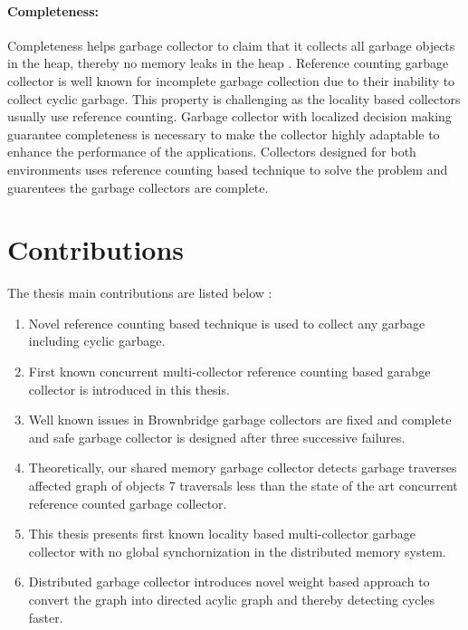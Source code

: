 \paragraph{Completeness:}
	Completeness helps garbage collector to claim that it collects all garbage objects in the heap, thereby no memory leaks in the heap . Reference counting garbage collector is well known for incomplete garbage collection due to their inability to collect cyclic garbage. This property is challenging as the locality based collectors usually use reference counting. Garbage collector with localized decision making guarantee completeness is necessary to make the collector highly adaptable to enhance the performance of the applications. Collectors designed for both environments uses reference counting based technique to solve the problem and guarentees the garbage collectors are complete.
\section{Contributions}
\label{intro:contr}
The thesis main contributions are listed below :
\begin{enumerate}
	\item Novel reference counting based technique is used to collect any garbage including cyclic garbage.	
	\item First known concurrent multi-collector reference counting based garabge collector is introduced in this thesis.
	\item Well known issues in Brownbridge garbage collectors are fixed and complete and safe garbage collector is designed after three successive failures.
	\item Theoretically, our shared memory garbage collector detects garbage traverses affected graph of objects 7 traversals less than the state of the art concurrent reference counted garbage collector.
	\item This thesis presents first known locality based multi-collector garbage collector with no global synchornization in the distributed memory system.
	\item Distributed garbage collector introduces novel weight based approach to convert the graph into directed acylic graph and thereby detecting cycles faster.
\end{enumerate}

